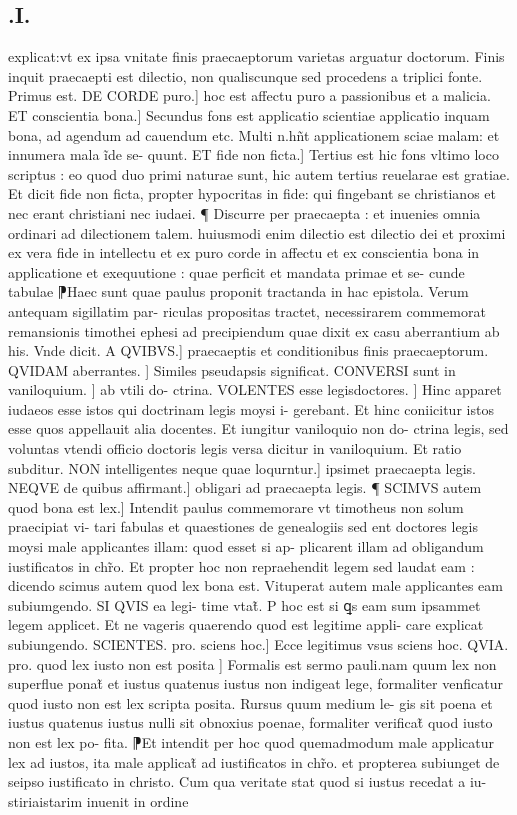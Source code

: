 \documentclass{article}
\begin{document}
\begin{pages}
\section*{.I. }
\marginpar{[ p.140 ]}\pstart explicat:vt ex ipsa vnitate finis praecaeptorum  varietas arguatur doctorum. Finis inquit praecaepti est dilectio, non qualiscunque  sed procedens a triplici fonte. Primus est. DE CORDE puro.] hoc est affectu puro  a passionibus et a malicia. ET conscientia bona.] Secundus fons est applicatio scientiae  applicatio inquam bona, ad agendum  ad cauendum etc. Multi n.hñt applicationem sciae malam: et innumera mala ĩde se- quunt. ET fide non ficta.] Tertius est hic fons vltimo loco scriptus : eo quod duo primi naturae sunt, hic autem tertius reuelarae est gratiae. Et dicit fide non ficta,  propter hypocritas in fide: qui fingebant se christianos  et nec erant christiani nec iudaei.  ¶ Discurre per praecaepta : et inuenies omnia ordinari ad dilectionem talem. huiusmodi enim dilectio est dilectio dei et proximi ex vera fide in intellectu  et ex puro corde in affectu  et ex conscientia bona in applicatione et exequutione : quae perficit et mandata primae et se- cunde tabulae ⁋Haec sunt quae paulus proponit tractanda in hac epistola. Verum antequam sigillatim par- riculas propositas tractet, necessirarem commemorat remansionis timothei ephesi ad precipiendum quae dixit ex casu aberrantium ab his. Vnde dicit. A QVIBVS.] praecaeptis et conditionibus finis praecaeptorum. QVIDAM aberrantes. ] Similes pseudapsis significat. CONVERSI sunt in vaniloquium. ] ab vtili do- ctrina. VOLENTES esse legisdoctores. ] Hinc apparet iudaeos esse istos qui doctrinam legis moysi i- gerebant. Et hinc coniicitur istos esse quos appellauit alia docentes. Et iungitur vaniloquio non do- ctrina legis, sed voluntas vtendi officio doctoris legis versa dicitur in vaniloquium. Et ratio subditur. NON intelligentes neque  quae loqurntur.] ipsimet praecaepta legis. NEQVE de quibus affirmant.] obligari ad praecaepta legis.  \pend\pstart ¶ SCIMVS autem quod bona est lex.] Intendit paulus commemorare vt timotheus non solum praecipiat vi- tari fabulas et quaestiones de genealogiis  sed ent doctores legis moysi male applicantes illam: quod esset si ap- plicarent illam ad obligandum iustificatos in chr̃o. Et propter hoc non repraehendit legem sed laudat eam : dicendo scimus autem quod lex bona est. Vituperat autem male applicantes eam subiumgendo. SI QVIS ea legi- time vtat̃. P hoc est si ꝗs eam sum ipsammet legem applicet. Et ne vageris quaerendo quod  est legitime appli- care  explicat subiungendo. SCIENTES. pro. sciens  hoc.] Ecce legitimus vsus  sciens hoc. QVIA. pro. quod lex iusto non est posita ] Formalis est sermo pauli.nam quum lex non superflue ponat̃  et iustus quatenus iustus non indigeat lege, formaliter venficatur quod iusto non est lex scripta posita. Rursus quum medium le- gis sit poena et iustus quatenus iustus nulli sit obnoxius poenae, formaliter verificat̃ quod iusto non est lex po- fita. ⁋Et intendit per hoc quod quemadmodum male applicatur lex ad iustos, ita male applicat̃ ad iustificatos in chr̃o. et propterea subiunget de seipso iustificato in christo. Cum qua veritate stat quod si iustus recedat a iu- stiriaistarim inuenit in ordine 
\end{pages}
\end{document}
